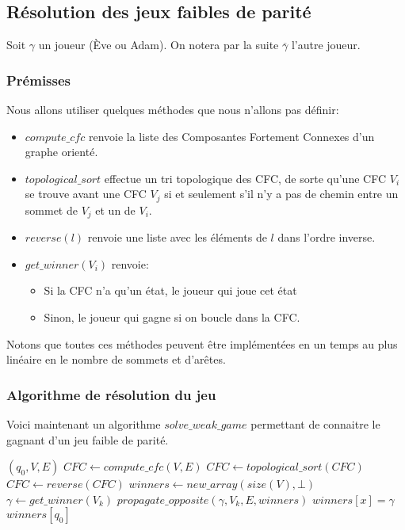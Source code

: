 \documentclass[10pt,a4paper]{article}
\begin{document}
\subsection{Résolution des jeux faibles de parité}
\label{algofpg}
Soit $\gamma$ un joueur (Ève ou Adam). On notera par la suite $\overline{\gamma}$ l'autre joueur.

\subsubsection{Prémisses}
Nous allons utiliser quelques méthodes que nous n'allons pas définir:
\begin{itemize}
	\item $compute\_cfc$ renvoie la liste des Composantes Fortement Connexes d'un graphe orienté.
	\item $topological\_sort$ effectue un tri topologique des CFC, de sorte qu'une CFC $V_i$ se trouve avant une CFC $V_j$ si et seulement s'il n'y a pas de chemin entre un sommet de $V_j$ et un de $V_i$. 
	\item $reverse(l)$ renvoie une liste avec les éléments de $l$ dans l'ordre inverse.
	\item $get\_winner(V_i)$ renvoie:
	\begin{itemize}
		\item Si la CFC n'a qu'un état, le joueur qui joue cet état
		\item Sinon, le joueur qui gagne si on boucle dans la CFC.
	\end{itemize}
\end{itemize}
Notons que toutes ces méthodes peuvent être implémentées en un temps au plus linéaire en le nombre de sommets et d'arêtes.

\subsubsection{Algorithme de résolution du jeu}
Voici maintenant un algorithme $solve\_weak\_game$ permettant de connaitre le gagnant d'un jeu faible de parité.

\begin{algorithm}
	\caption{$solve\_weak\_game$}
\begin{algorithmic}[1]
	\REQUIRE $(q_0, V, E)$ 
	\STATE $CFC \leftarrow compute\_cfc(V, E)$
	\STATE $CFC \leftarrow topological\_sort(CFC)$
	\STATE $CFC \leftarrow reverse(CFC)$
	\STATE $winners \leftarrow new\_array(size(V), \bot)$
		\STATE $\gamma \leftarrow get\_winner(V_k)$
		\STATE $propagate\_opposite(\gamma, V_k, E, winners)$
				\STATE $winners[x] = \gamma$
			\ENDIF
		\ENDFOR
	\ENDFOR
	\RETURN $winners[q_0]$
\end{algorithmic}
\end{algorithm}
\end{document}
